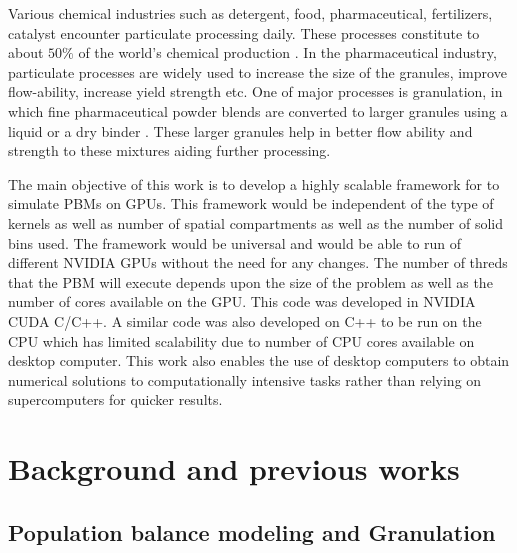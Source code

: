 \documentclass[preprint,10pt,authoryear,review]{elsarticle}
\begin{document}
Various chemical industries such as detergent, food, pharmaceutical, fertilizers, catalyst 
encounter particulate processing daily. These processes constitute to about $50\%$ of the 
world's chemical production \citep{seville1997}.
In the pharmaceutical industry, particulate processes are widely used to increase 
the size of the granules, improve flow-ability, increase yield strength etc. One of 
major processes is granulation, in which fine pharmaceutical powder 
blends are converted to larger granules using a liquid or a dry binder \citep{Chaturbedi2017}. 
These larger granules help in better flow ability and strength to these mixtures 
aiding further processing. 
%


The main objective of this work is to develop a highly scalable framework for to simulate 
PBMs on GPUs. This framework would be independent of the type of kernels as well as number 
of spatial compartments as well as the number of solid bins used. The framework would be 
universal and would be able to run of different NVIDIA GPUs without the need for any changes. 
The number of threds that the PBM will execute depends upon the size of the problem as well as 
the number of cores available on the GPU. This code was developed in NVIDIA CUDA C/C++. 
A similar code was also developed on C++ to be run on the CPU which has limited scalability 
due to number of CPU cores available on desktop computer. This work also enables the use of 
desktop computers to obtain numerical solutions to computationally intensive tasks rather 
than relying on supercomputers for quicker results.


\section{Background and previous works}
\label{secBkgd}
\subsection{Population balance modeling and Granulation}
\end{document}
